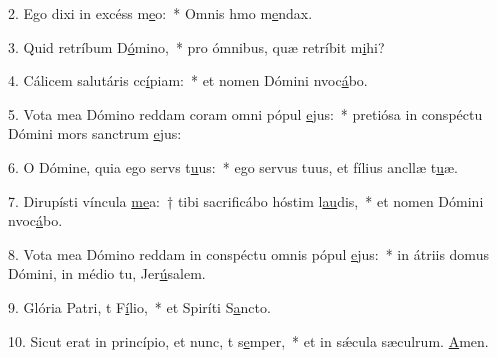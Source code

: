 2. Ego dixi in excéss m\uline{e}o:~* Omnis hmo m\uline{e}ndax.\par 
3. Quid retríbum D\uline{ó}mino,~* pro ómnibus, quæ retríbit m\uline{i}hi?\par 
4. Cálicem salutáris cc\uline{í}piam:~* et nomen Dómini nvoc\uline{á}bo.\par 
5. Vota mea Dómino reddam coram omni pópul \uline{e}jus:~* pretiósa in conspéctu Dómini mors sanctrum \uline{e}jus:\par 
6. O Dómine, quia ego servs t\uline{u}us:~* ego servus tuus, et fílius ancllæ t\uline{u}æ.\par 
7. Dirupísti víncula \uline{me}a:~† tibi sacrificábo hóstim l\uline{au}dis,~* et nomen Dómini nvoc\uline{á}bo.\par 
8. Vota mea Dómino reddam in conspéctu omnis pópul \uline{e}jus:~* in átriis domus Dómini, in médio tu, Jer\uline{ú}salem.\par 
9. Glória Patri, t F\uline{í}lio,~* et Spiríti S\uline{a}ncto.\par 
10. Sicut erat in princípio, et nunc, t s\uline{e}mper,~* et in sǽcula sæculrum. \uline{A}men.\par 
